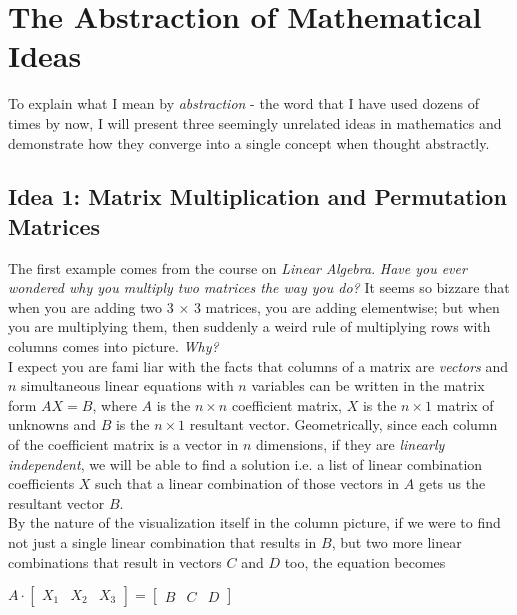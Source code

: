 \setlength{\headheight}{14.49998pt}
\addtolength{\topmargin}{-2.49998pt}

\section{The Abstraction of Mathematical Ideas}

To explain what I mean by \textit{abstraction} - the word that I have used dozens of times by now, I will present three seemingly unrelated ideas in mathematics and demonstrate how they converge into a single concept when thought abstractly.

\subsection{Idea 1: Matrix Multiplication and Permutation Matrices} 

\vspace{3pt} 
The first example comes from the course on \textit{Linear Algebra}. \textit{Have you ever wondered why you multiply two matrices the way you do?} It seems so bizzare that when you are adding two 3 $\times$ 3 matrices, you are adding elementwise; but when you are multiplying them, then suddenly a weird rule of multiplying rows with columns comes into picture. \textit{Why?} \\

I expect you are fami
liar with the facts that columns of a matrix are \textit{vectors} and $n$ simultaneous linear equations with $n$ variables can be written in the matrix form $AX = B$, where $A$ is the $n \times n$ coefficient matrix, $X$ is the $n \times 1$ matrix of unknowns and $B$ is the $n \times 1$ resultant vector. Geometrically, since each column of the coefficient matrix is a vector in $n$ dimensions, if they are \textit{linearly independent}, we will be able to find a solution i.e. a list of linear combination coefficients $X$ such that a linear combination of those vectors in $A$ gets us the resultant vector $B$. \\

By the nature of the visualization itself in the column picture, if we were to find not just a single linear combination that results in $B$, but two more linear combinations that result in vectors $C$ and $D$ too, the equation becomes 

\begin{center}
$A \cdot \begin{bmatrix} X_1 & X_2 & X_3 \end{bmatrix} = \begin{bmatrix} B & C & D \end{bmatrix}$
\end{center}

